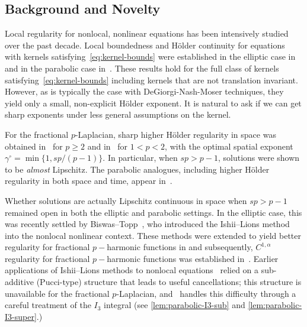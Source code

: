 \documentclass[11pt, a4paper, twoside]{article}
\theoremstyle{definition}
\theoremstyle{remark}
\begin{document}
\subsection{Background and Novelty}

Local regularity for nonlocal, nonlinear equations has been
intensively studied over the past decade. Local boundedness and
H\"{o}lder continuity for equations with kernels
satisfying~\eqref{eq:kernel-bounds} were established in the
elliptic case in~\cite{DiCastroKuusiPalatucci2016, Cozzi2017,
AdimurthiPrasadTewary2023} and in the parabolic case
in~\cite{AdimurthiPrasadTewary2025LocalHolder,
Liao2024HolderParabolicFracPLap, DingZhangZhou2021,
PrasadTewary2023}. These results hold for
the full class of kernels satisfying~\eqref{eq:kernel-bounds} including kernels that are not translation invariant. However, as is typically the case with  DeGiorgi-Nash-Moser techniques, they yield only a
small, non-explicit H\"{o}lder exponent. It is natural to ask if we can get sharp exponents under less general assumptions on the kernel. 

For the fractional $p$-Laplacian, sharp higher H\"{o}lder regularity in space was
obtained in~\cite{BrascoLindgrenSchikorra2018} for $p \ge 2$
and in~\cite{GarainLindgren2024} for $1 < p < 2$, with the
optimal spatial exponent
$\gamma^\circ = \min\{1, sp/(p-1)\}$. In particular, when
$sp > p-1$, solutions were shown to be \emph{almost} Lipschitz. The
parabolic analogues, including higher H\"{o}lder regularity in
both space and time, appear
in~\cite{BrascoLindgrenStromqvist2021,
GarainLindgrenTavakoli2025}.

Whether solutions are actually Lipschitz continuous in space
when $sp > p-1$ remained open in both the elliptic and
parabolic settings. In the elliptic case, this was recently
settled by Biswas--Topp~\cite{BiswasTopp2025}, who introduced
the Ishii--Lions method~\cite{IshiiLions1990} into the nonlocal
nonlinear context. These methods were extended to yield better regularity for fractional $p-$harmonic functions in \cite{BiswasSen2025} and subsequently, $C^{1,\alpha}$ regularity for fractional $p-$harmonic functions  was
 established
in~\cite{GiovagnoliJesusSilvestre2025}. Earlier applications
of Ishii--Lions methods to nonlocal
equations~\cite{BarlesChasseigneImbert2011,
BarlesChasseigneCiomagaImbert2012, BiswasQuaasTopp2025} relied
on a sub-additive (Pucci-type) structure that leads to useful
cancellations; this structure is unavailable for the fractional
$p$-Laplacian, and~\cite{BiswasTopp2025} handles this
difficulty through a careful treatment of the $I_3$ integral (see \cref{lem:parabolic-I3-sub} and \cref{lem:parabolic-I3-super}.)
\end{document}
